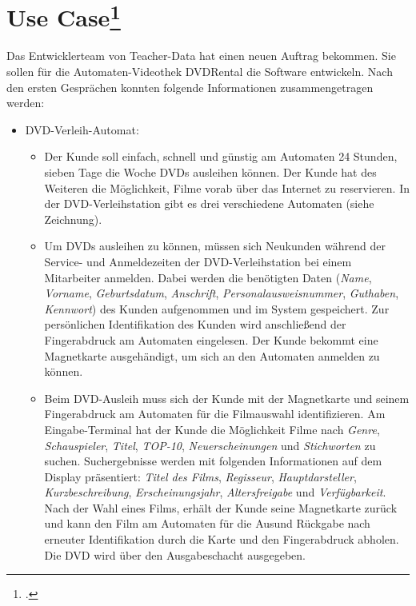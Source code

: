 \documentclass{bschlangaul-aufgabe}
\begin{document}

\section{Use Case\footcite{sosy:ab:2}}

Das Entwicklerteam von Teacher-Data hat einen neuen Auftrag bekommen.
Sie sollen für die Automaten-Videothek DVDRental die Software
entwickeln. Nach den ersten Gesprächen konnten folgende Informationen
zusammengetragen werden:

\begin{itemize}
\item DVD-Verleih-Automat:

\begin{itemize}
\item Der Kunde soll einfach, schnell und günstig am Automaten 24
Stunden, sieben Tage die Woche DVDs ausleihen können. Der Kunde hat des
Weiteren die Möglichkeit, Filme vorab über das Internet zu reservieren.
In der DVD-Verleihstation gibt es drei verschiedene Automaten (siehe
Zeichnung).

\item Um DVDs ausleihen zu können, müssen sich Neukunden während der
Service- und Anmeldezeiten der DVD-Verleihstation bei einem Mitarbeiter
anmelden. Dabei werden die benötigten Daten (\emph{Name},
\emph{Vorname}, \emph{Geburtsdatum}, \emph{Anschrift},
\emph{Personalausweisnummer}, \emph{Guthaben}, \emph{Kennwort}) des
Kunden aufgenommen und im System gespeichert. Zur persönlichen
Identifikation des Kunden wird anschließend der Fingerabdruck am
Automaten eingelesen. Der Kunde bekommt eine Magnetkarte ausgehändigt,
um sich an den Automaten anmelden zu können.

\item Beim DVD-Ausleih muss sich der Kunde mit der Magnetkarte und
seinem Fingerabdruck am Automaten für die Filmauswahl identifizieren. Am
Eingabe-Terminal hat der Kunde die Möglichkeit Filme nach \emph{Genre},
\emph{Schauspieler}, \emph{Titel}, \emph{TOP-10},
\emph{Neuerscheinungen} und \emph{Stichworten} zu suchen. Suchergebnisse
werden mit folgenden Informationen auf dem Display präsentiert:
\emph{Titel des Films}, \emph{Regisseur}, \emph{Hauptdarsteller},
\emph{Kurzbeschreibung}, \emph{Erscheinungsjahr}, \emph{Altersfreigabe}
und \emph{Verfügbarkeit}. Nach der Wahl eines Films, erhält der Kunde
seine Magnetkarte zurück und kann den Film am Automaten für die Ausund
Rückgabe nach erneuter Identifikation durch die Karte und den
Fingerabdruck abholen. Die DVD wird über den Ausgabeschacht ausgegeben.


\end{itemize}
\end{itemize}
\end{document}
